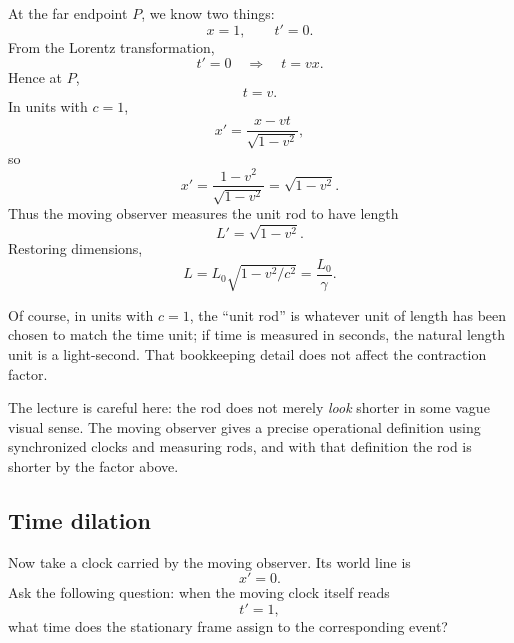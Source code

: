 At the far endpoint \(P\), we know two things:
\begin{equation}
x=1,\qquad t'=0.
\end{equation}
From the Lorentz transformation,
\begin{equation}
t'=0 \quad \Longrightarrow \quad t=vx.
\end{equation}
Hence at \(P\),
\begin{equation}
t=v.
\end{equation}
In units with \(c=1\),
\begin{equation}
x'=\frac{x-vt}{\sqrt{1-v^2}},
\end{equation}
so
\begin{equation}
x'=\frac{1-v^2}{\sqrt{1-v^2}}=\sqrt{1-v^2}.
\end{equation}
Thus the moving observer measures the unit rod to have length
\begin{equation}
L'=\sqrt{1-v^2}.
\end{equation}
Restoring dimensions,
\begin{equation}
L=L_0\sqrt{1-v^2/c^2}=\frac{L_0}{\gamma}.
\end{equation}

Of course, in units with \(c=1\), the ``unit rod'' is whatever unit of length has been chosen to match the time unit; if time is measured in seconds, the natural length unit is a light-second. That bookkeeping detail does not affect the contraction factor.

The lecture is careful here: the rod does not merely \emph{look} shorter in some vague visual sense. The moving observer gives a precise operational definition using synchronized clocks and measuring rods, and with that definition the rod is shorter by the factor above.

\subsection{Time dilation}

Now take a clock carried by the moving observer. Its world line is
\begin{equation}
x'=0.
\end{equation}
Ask the following question: when the moving clock itself reads
\begin{equation}
t'=1,
\end{equation}
what time does the stationary frame assign to the corresponding event?

